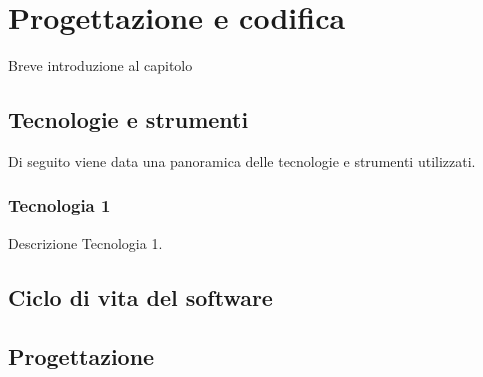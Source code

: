 \chapter{Progettazione e codifica}
\label{chap:design_coding}
Breve introduzione al capitolo

\section{Tecnologie e strumenti}
\label{sec:tecnologie-strumenti}
Di seguito viene data una panoramica delle tecnologie e strumenti utilizzati.

\subsection*{Tecnologia 1}
Descrizione Tecnologia 1.

\section{Ciclo di vita del software}
\label{sec:ciclo-vita-software}

\section{Progettazione}
\label{sec:progettazione}



\newpage